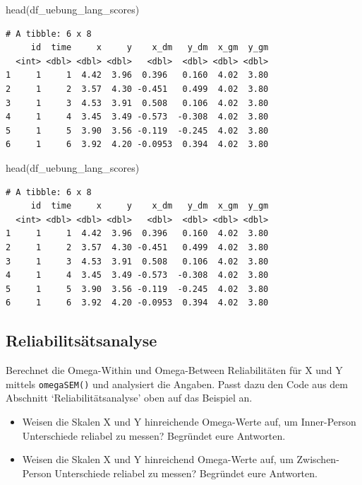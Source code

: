 \documentclass[
  letterpaper,
  DIV=11,
  numbers=noendperiod]{scrreprt}
\newenvironment{Shaded}{\begin{snugshade}}{\end{snugshade}}
\newcommand{\FunctionTok}[1]{\textcolor[rgb]{0.28,0.35,0.67}{#1}}
\newcommand{\NormalTok}[1]{\textcolor[rgb]{0.00,0.23,0.31}{#1}}
\providecommand{\tightlist}{%
  \setlength{\itemsep}{0pt}\setlength{\parskip}{0pt}}\usepackage{longtable,booktabs,array}
\begin{document}
\begin{Shaded}
\begin{Highlighting}[]
\FunctionTok{head}\NormalTok{(df\_uebung\_lang\_scores)}
\end{Highlighting}
\end{Shaded}

\begin{verbatim}
# A tibble: 6 x 8
     id  time     x     y    x_dm   y_dm  x_gm  y_gm
  <int> <dbl> <dbl> <dbl>   <dbl>  <dbl> <dbl> <dbl>
1     1     1  4.42  3.96  0.396   0.160  4.02  3.80
2     1     2  3.57  4.30 -0.451   0.499  4.02  3.80
3     1     3  4.53  3.91  0.508   0.106  4.02  3.80
4     1     4  3.45  3.49 -0.573  -0.308  4.02  3.80
5     1     5  3.90  3.56 -0.119  -0.245  4.02  3.80
6     1     6  3.92  4.20 -0.0953  0.394  4.02  3.80
\end{verbatim}

\begin{Shaded}
\begin{Highlighting}[]
\FunctionTok{head}\NormalTok{(df\_uebung\_lang\_scores)}
\end{Highlighting}
\end{Shaded}

\begin{verbatim}
# A tibble: 6 x 8
     id  time     x     y    x_dm   y_dm  x_gm  y_gm
  <int> <dbl> <dbl> <dbl>   <dbl>  <dbl> <dbl> <dbl>
1     1     1  4.42  3.96  0.396   0.160  4.02  3.80
2     1     2  3.57  4.30 -0.451   0.499  4.02  3.80
3     1     3  4.53  3.91  0.508   0.106  4.02  3.80
4     1     4  3.45  3.49 -0.573  -0.308  4.02  3.80
5     1     5  3.90  3.56 -0.119  -0.245  4.02  3.80
6     1     6  3.92  4.20 -0.0953  0.394  4.02  3.80
\end{verbatim}

\subsection{Reliabilitsätsanalyse}\label{reliabilitsuxe4tsanalyse}

Berechnet die Omega-Within und Omega-Between Reliabilitäten für X und Y
mittels \texttt{omegaSEM()} und analysiert die Angaben. Passt dazu den
Code aus dem Abschnitt `Reliabilitätsanalyse' oben auf das Beispiel an.

\begin{itemize}
\tightlist
\item
  Weisen die Skalen X und Y hinreichende Omega-Werte auf, um
  Inner-Person Unterschiede reliabel zu messen? Begründet eure
  Antworten.
\item
  Weisen die Skalen X und Y hinreichend Omega-Werte auf, um
  Zwischen-Person Unterschiede reliabel zu messen? Begründet eure
  Antworten.
\end{itemize}
\end{document}
